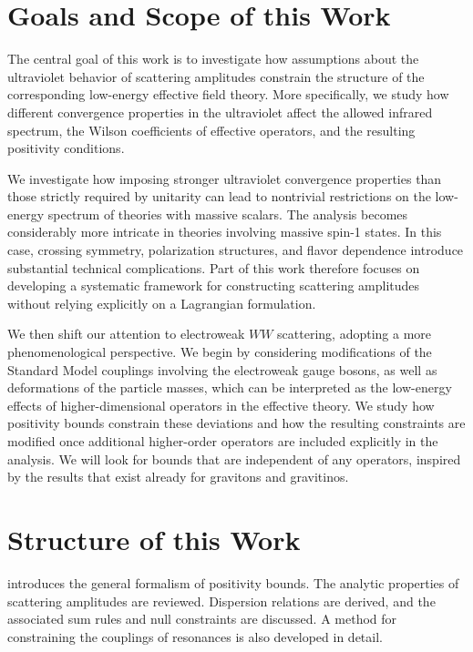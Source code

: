 \section{Goals and Scope of this Work}

The central goal of this work is to investigate how assumptions about the ultraviolet behavior of scattering amplitudes constrain the structure of the corresponding low-energy effective field theory. More specifically, we study how different convergence properties in the ultraviolet affect the allowed infrared spectrum, the Wilson coefficients of effective operators, and the resulting positivity conditions.

We investigate how imposing stronger ultraviolet convergence properties than those strictly required by unitarity can lead to nontrivial restrictions on the low-energy spectrum of theories with massive scalars. The analysis becomes considerably more intricate in theories involving massive spin-1 states. In this case, crossing symmetry, polarization structures, and flavor dependence introduce substantial technical complications. Part of this work therefore focuses on developing a systematic framework for constructing scattering amplitudes without relying explicitly on a Lagrangian formulation.

We then shift our attention to electroweak \(WW\) scattering, adopting a more
phenomenological perspective. We begin by considering modifications of the Standard Model couplings involving the electroweak gauge bosons, as well as deformations of the particle masses, which can be interpreted as the low-energy effects of higher-dimensional operators in the effective theory. We study how positivity bounds constrain these deviations and how the resulting constraints are modified once additional higher-order operators are included explicitly in the analysis. We will look for bounds that are independent of any operators, inspired by the results that exist already for gravitons and gravitinos. 

\section{Structure of this Work}

 introduces the general formalism of positivity bounds. The analytic properties of scattering amplitudes are reviewed. Dispersion relations are derived, and the associated sum rules and null constraints are discussed. A method for constraining the couplings of resonances is also developed in detail.


